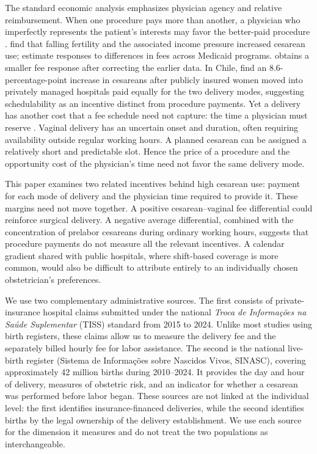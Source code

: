\documentclass[12pt]{article}
\begin{document}
The standard economic analysis emphasizes physician agency and relative reimbursement. When one procedure pays more than another, a physician who imperfectly represents the patient's interests may favor the better-paid procedure \citep{dranove1988, mcguire2000}. \citet{gruber1996physician} find that falling fertility and the associated income pressure increased cesarean use; \citet{gruber1999physician} estimate responses to differences in fees across Medicaid programs. \citet{grant2009} obtains a smaller fee response after correcting the earlier data. In Chile, \citet{elejalde2021} find an 8.6-percentage-point increase in cesareans after publicly insured women moved into privately managed hospitals paid equally for the two delivery modes, suggesting schedulability as an incentive distinct from procedure payments. Yet a delivery has another cost that a fee schedule need not capture: the time a physician must reserve \citep{brown1996}. Vaginal delivery has an uncertain onset and duration, often requiring availability outside regular working hours. A planned cesarean can be assigned a relatively short and predictable slot. Hence the price of a procedure and the opportunity cost of the physician's time need not favor the same delivery mode.

This paper examines two related incentives behind high cesarean use: payment for each mode of delivery and the physician time required to provide it. These margins need not move together. A positive cesarean–vaginal fee differential could reinforce surgical delivery. A negative average differential, combined with the concentration of prelabor cesareans during ordinary working hours, suggests that procedure payments do not measure all the relevant incentives. A calendar gradient shared with public hospitals, where shift-based coverage is more common, would also be difficult to attribute entirely to an individually chosen obstetrician's preferences.

We use two complementary administrative sources. The first consists of private-insurance hospital claims submitted under the national \textit{Troca de Informações na Saúde Suplementar} (TISS) standard from 2015 to 2024. Unlike most studies using birth registers, these claims allow us to measure the delivery fee and the separately billed hourly fee for labor assistance. The second is the national live-birth register (Sistema de Informações sobre Nascidos Vivos, SINASC), covering approximately 42 million births during 2010–2024. It provides the day and hour of delivery, measures of obstetric risk, and an indicator for whether a cesarean was performed before labor began. These sources are not linked at the individual level: the first identifies insurance-financed deliveries, while the second identifies births by the legal ownership of the delivery establishment. We use each source for the dimension it measures and do not treat the two populations as interchangeable.
\end{document}
